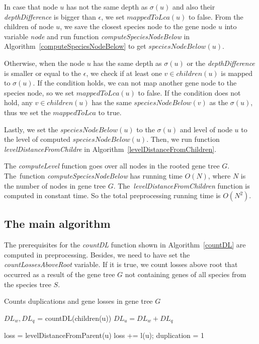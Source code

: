 In case that node $u$ has not the same depth as $\sigma(u)$ and also their \emph{depthDifference} is bigger than $\epsilon$, we set $mappedToLca(u)$ to false. From the children of node $u$, we save the closest species node to the gene node $u$ into variable \emph{node} and run function \emph{computeSpeciesNodeBelow} in Algorithm~\ref{computeSpeciesNodeBelow} to get $speciesNodeBelow(u)$.

Otherwise, when the node $u$ has the same depth as $\sigma(u)$ or the \emph{depthDifference} is smaller or equal to the $\epsilon$, we check if at least one $v \in children(u)$ is mapped to $\sigma(u)$. If the condition holds, we can not map another gene node to the species node, so we set $mappedToLca(u)$ to false. If the condition does not hold, any $v \in children (u)$ has the same $speciesNodeBelow(v)$ as the $\sigma(u)$, thus we set the $mappedToLca$ to true.

Lastly, we set the $speciesNodeBelow(u)$ to the $\sigma(u)$ and level of node $u$ to the level of computed $speciesNodeBelow(u)$. Then, we run function \emph{levelDistanceFromChildre} in Algorithm~\ref{levelDistanceFromChildren}.

The \emph{computeLevel} function goes over all nodes in the rooted gene tree $G$. The~function \emph{computeSpeciesNodeBelow} has running time $O(N)$, where $N$ is the number of nodes in gene tree $G$. The~\emph{levelDistanceFromChildren} function is computed in constant time. So the total preprocessing running time is $O(N^2)$.

\subsection{The main algorithm} \label{main_algorithm}

The prerequisites for the \emph{countDL} function shown in Algorithm~\ref{countDL} are computed in preprocessing. Besides, we need to have set the \emph{countLossesAboveRoot} variable. If it is true, we count losses above root that occurred as a result of the gene tree $G$ not containing genes of all species from the species tree $S$.

\begin{algorithm}[!htbp]
\caption{Counts duplications and gene losses in gene tree $G$} 
\label{countDL}
\begin{algorithmic}[1]
		\State $DL_w, DL_q$ = countDL(children(u))
		\State $DL_u = DL_w+DL_q$
	\EndIf

	\State loss = levelDistanceFromParent(u)
		\State loss += l(u); 
	\EndIf
		\State duplication = 1
	\EndIf
	
\EndFunction
\end{algorithmic}
\end{algorithm}

